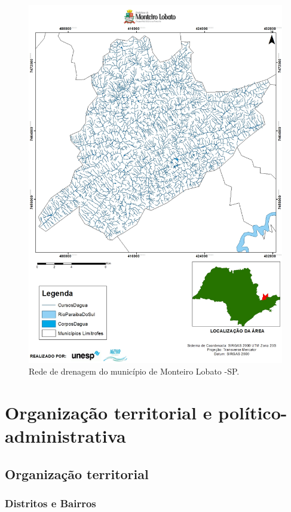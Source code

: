 \newpage
 \begin{figure}[h!]
 	\centering
 	\includegraphics[width=1\linewidth]{produtos/proddois/image022}
 	\caption{Rede de drenagem do município de Monteiro Lobato -SP.}
 	\label{fig:image022}
 \end{figure}
\clearpage

\section{Organização territorial e político-administrativa}
\subsection{Organização territorial}
\subsubsection{Distritos e Bairros}

